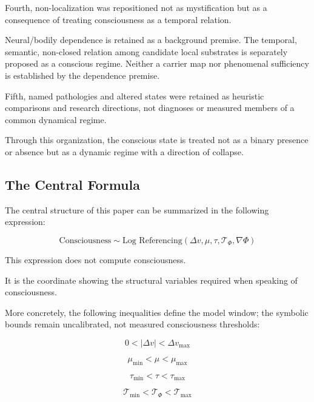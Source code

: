 Fourth, non-localization was repositioned not as mystification but as a consequence of treating consciousness as a temporal relation.

Neural/bodily dependence is retained as a background premise. The temporal, semantic, non-closed relation among candidate local substrates is separately proposed as a conscious regime. Neither a carrier map nor phenomenal sufficiency is established by the dependence premise.

Fifth, named pathologies and altered states were retained as heuristic comparisons and research directions, not diagnoses or measured members of a common dynamical regime.

Through this organization, the conscious state is treated not as a binary presence or absence but as a dynamic regime with a direction of collapse.

\subsection{The Central Formula}


The central structure of this paper can be summarized in the following expression:

\begin{equation}
\text{Consciousness} \sim \text{Log Referencing}\!\left(\Delta v, \mu, \tau, \mathcal{T}_{\Phi}, \nabla\Phi\right)
\end{equation}

This expression does not compute consciousness.

It is the coordinate showing the structural variables required when speaking of consciousness.

More concretely, the following inequalities define the model window; the symbolic bounds remain uncalibrated, not measured consciousness thresholds:

\begin{equation}
0 < |\Delta v| < \Delta v_{\max}
\end{equation}

\begin{equation}
\mu_{\min} < \mu < \mu_{\max}
\end{equation}

\begin{equation}
\tau_{\min} < \tau < \tau_{\max}
\end{equation}

\begin{equation}
\mathcal{T}_{\min} < \mathcal{T}_{\Phi} < \mathcal{T}_{\max}
\end{equation}

